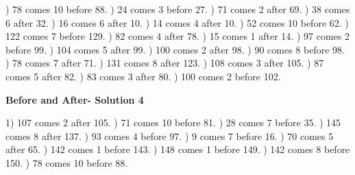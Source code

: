 \documentclass{article}%
\begin{document}
) 78 comes 10 before 88.%
) 24 comes 3 before 27.%
) 71 comes 2 after 69.%
) 38 comes 6 after 32.%
) 16 comes 6 after 10.%
) 14 comes 4 after 10.%
) 52 comes 10 before 62.%
) 122 comes 7 before 129.%
) 82 comes 4 after 78.%
) 15 comes 1 after 14.%
) 97 comes 2 before 99.%
) 104 comes 5 after 99.%
) 100 comes 2 after 98.%
) 90 comes 8 before 98.%
) 78 comes 7 after 71.%
) 131 comes 8 after 123.%
) 108 comes 3 after 105.%
) 87 comes 5 after 82.%
) 83 comes 3 after 80.%
) 100 comes 2 before 102.%
\newline%
\newpage%
\large%
\begin{center}%
\textbf{Before and After- Solution 4}%
\newline%
\end{center} \normalsize%
1) 107 comes 2 after 105.%
) 71 comes 10 before 81.%
) 28 comes 7 before 35.%
) 145 comes 8 after 137.%
) 93 comes 4 before 97.%
) 9 comes 7 before 16.%
) 70 comes 5 after 65.%
) 142 comes 1 before 143.%
) 148 comes 1 before 149.%
) 142 comes 8 before 150.%
) 78 comes 10 before 88.%
\end{document}
